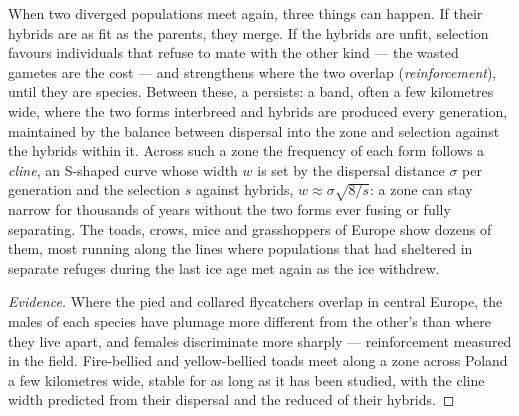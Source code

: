 \begin{proposition}\label{prop:b2:speciation:reinforcement}
When two diverged populations meet again, three things can happen.
If their hybrids are as fit as the parents, they merge. If the
hybrids are unfit, selection favours individuals that refuse to
mate with the other kind --- the wasted gametes are the cost --- and
 strengthens where the two overlap
(\emph{reinforcement}), until they are species. Between these, a
\emph{} persists: a band, often a few kilometres wide,
where the two forms interbreed and hybrids are produced every
generation, maintained by the balance between dispersal into the
zone and selection against the hybrids within it. Across such a
zone the frequency of each form follows a \emph{cline}, an S-shaped
curve whose width $w$ is set by the dispersal distance $\sigma$ per
generation and the selection $s$ against hybrids, $w \approx
\sigma\sqrt{8/s}$: a zone can stay narrow for thousands of years
without the two forms ever fusing or fully separating. The toads,
crows, mice and grasshoppers of Europe show dozens of them, most
running along the lines where populations that had sheltered in
separate refuges during the last ice age met again as the ice
withdrew.
\end{proposition}
\begin{proof}[Evidence]
Where the pied and collared flycatchers overlap in central Europe,
the males of each species have plumage more different from the
other's than where they live apart, and females discriminate more
sharply --- reinforcement measured in the field. Fire-bellied and
yellow-bellied toads meet along a zone across Poland a few
kilometres wide, stable for as long as it has been studied, with
the cline width predicted from their dispersal and the reduced
 of their hybrids.
\end{proof}

